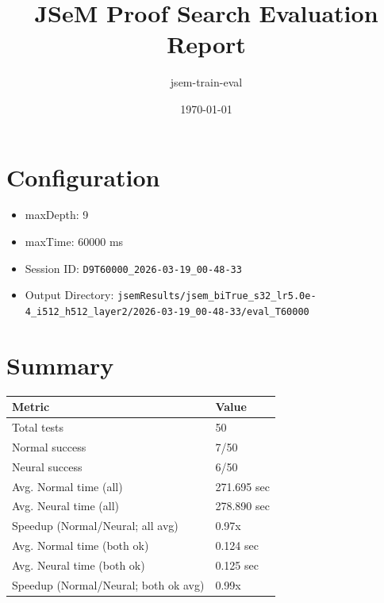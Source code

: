 \documentclass[a4paper,10pt]{article}
\title{JSeM Proof Search Evaluation Report}
\author{jsem-train-eval}
\date{\today}
\begin{document}
\maketitle

\section{Configuration}
\begin{itemize}
\item maxDepth: 9
\item maxTime: 60000 ms
\item Session ID: \texttt{D9T60000\_2026-03-19\_00-48-33}
\item Output Directory: \texttt{jsemResults/jsem\_biTrue\_s32\_lr5.0e-4\_i512\_h512\_layer2/2026-03-19\_00-48-33/eval\_T60000}
\end{itemize}

\section{Summary}
\begin{tabular}{ll}
\toprule
\textbf{Metric} & \textbf{Value} \\
\midrule
Total tests & 50 \\
Normal success & 7/50 \\
Neural success & 6/50 \\
\midrule
Avg. Normal time (all) & 271.695 sec \\
Avg. Neural time (all) & 278.890 sec \\
Speedup (Normal/Neural; all avg) & 0.97x \\
Avg. Normal time (both ok) & 0.124 sec \\
Avg. Neural time (both ok) & 0.125 sec \\
Speedup (Normal/Neural; both ok avg) & 0.99x \\
\bottomrule
\end{tabular}
\end{document}
